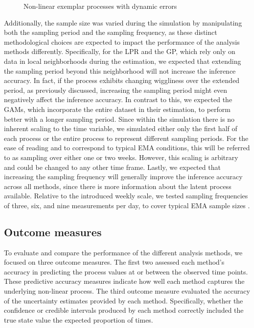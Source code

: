 \documentclass[man, floatsintext]{apa7}
\begin{document}
\begin{figure}[!t]
  \caption{Non-linear exemplar processes with dynamic errors}
  \label{fig:exemplar_pn}
\end{figure}

Additionally, the sample size was varied during the simulation by manipulating
both the sampling period and the sampling frequency, as these distinct
methodological choices are expected to impact the performance of the analysis
methods differently. Specifically, for the LPR and the GP, which rely only on
data in local neighborhoods during the estimation, we expected that extending
the sampling period beyond this neighborhood will not increase the inference
accuracy. In fact, if the process exhibits changing wiggliness over the
extended period, as previously discussed, increasing the sampling period might
even negatively affect the inference accuracy. In contrast to this, we expected
the GAMs, which incorporate the entire dataset in their estimation, to perform
better with a longer sampling period. Since within the simulation there is no
inherent scaling to the time variable, we simulated either only the first half
of each process or the entire process to represent different sampling periods.
For the ease of reading and to correspond to typical EMA conditions, this will
be referred to as sampling over either one or two weeks. However, this scaling
is arbitrary and could be changed to any other time frame. Lastly, we expected
that increasing the sampling frequency will generally improve the inference
accuracy across all methods, since there is more information about the latent
process available. Relative to the introduced weekly scale, we tested sampling
frequencies of three, six, and nine measurements per day, to cover typical EMA
sample sizes \parencite{wrzus_ecological_2023}.

\subsection{Outcome measures}

To evaluate and compare the performance of the different analysis methods, we
focused on three outcome measures. The first two assessed each method's
accuracy in predicting the process values at or between the observed time
points. These predictive accuracy measures indicate how well each method
captures the underlying non-linear process. The third outcome measure evaluated
the accuracy of the uncertainty estimates provided by each method.
Specifically, whether the confidence or credible intervals produced by each
method correctly included the true state value the expected proportion of
times.
\end{document}
